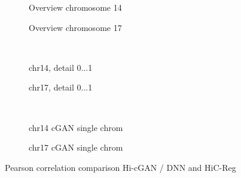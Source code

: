 \begin{figure}[htbp]
 \begin{subfigure}{0.45\textwidth}
  \caption{Overview chromosome 14}\label{fig:results:zhang-vs-ours_pearson_14overview}
 \end{subfigure}\hfill
\begin{subfigure}{0.45\textwidth}
  \caption{Overview chromosome 17}\label{fig:results:zhang-vs-ours_pearson_17overview}
 \end{subfigure}\\[4mm]
 \begin{subfigure}{0.45\textwidth}
  \caption{chr14, detail 0...\SI{1}{\mega\bp}}\label{fig:results:zhang-vs-ours_pearson_14detail}
 \end{subfigure}\hfill
 \begin{subfigure}{0.45\textwidth}
  \caption{chr17, detail 0...\SI{1}{\mega\bp}}\label{fig:results:zhang-vs-ours_pearson_17detail}
 \end{subfigure}\\[4mm]
 \begin{subfigure}{0.45\textwidth}
    \caption{chr14 cGAN single chrom}\label{fig:results:zhang-vs-ours_pearson_14singlechrom}
 \end{subfigure}\hfill
 \begin{subfigure}{0.45\textwidth}
    \caption{chr17 cGAN single chrom}\label{fig:results:zhang-vs-ours_pearson_17singlechrom}
 \end{subfigure}
  \caption{Pearson correlation comparison Hi-cGAN / DNN and HiC-Reg \cite{Zhang2019}} \label{fig:results:zhang-vs-ours_pearson}
\end{figure}

